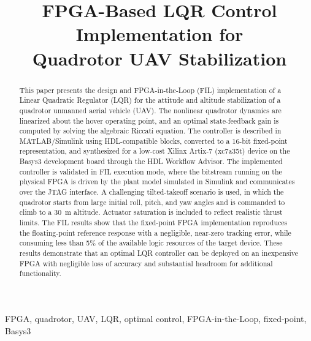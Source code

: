 \documentclass[conference]{IEEEtran}
\begin{document}
\title{FPGA-Based LQR Control Implementation for\\ Quadrotor UAV Stabilization}

\author{
}

\maketitle

\begin{abstract}
This paper presents the design and FPGA-in-the-Loop (FIL) implementation of a Linear Quadratic Regulator (LQR) for the attitude and altitude stabilization of a quadrotor unmanned aerial vehicle (UAV). The nonlinear quadrotor dynamics are linearized about the hover operating point, and an optimal state-feedback gain is computed by solving the algebraic Riccati equation. The controller is described in MATLAB/Simulink using HDL-compatible blocks, converted to a 16-bit fixed-point representation, and synthesized for a low-cost Xilinx Artix-7 (xc7a35t) device on the Basys3 development board through the HDL Workflow Advisor. The implemented controller is validated in FIL execution mode, where the bitstream running on the physical FPGA is driven by the plant model simulated in Simulink and communicates over the JTAG interface. A challenging tilted-takeoff scenario is used, in which the quadrotor starts from large initial roll, pitch, and yaw angles and is commanded to climb to a 30~m altitude. Actuator saturation is included to reflect realistic thrust limits. The FIL results show that the fixed-point FPGA implementation reproduces the floating-point reference response with a negligible, near-zero tracking error, while consuming less than 5\% of the available logic resources of the target device. These results demonstrate that an optimal LQR controller can be deployed on an inexpensive FPGA with negligible loss of accuracy and substantial headroom for additional functionality.
\end{abstract}

\begin{IEEEkeywords}
FPGA, quadrotor, UAV, LQR, optimal control, FPGA-in-the-Loop, fixed-point, Basys3
\end{IEEEkeywords}
\end{document}
